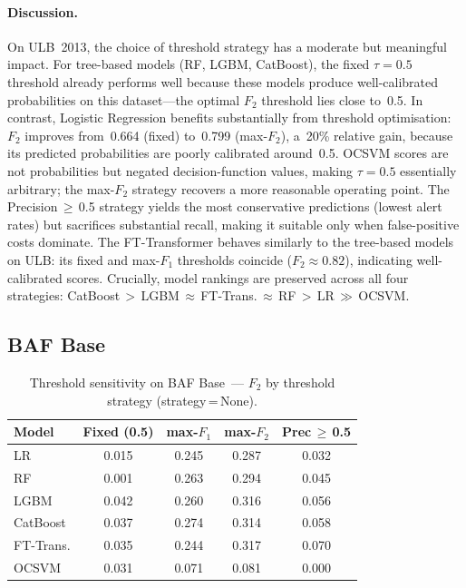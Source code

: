 \paragraph{Discussion.}
On ULB~2013, the choice of threshold strategy has a moderate but meaningful impact.
For tree-based models (RF, LGBM, CatBoost), the fixed $\tau=0.5$ threshold already performs well because these models produce well-calibrated probabilities on this dataset---the optimal $F_2$ threshold lies close to~0.5.
In contrast, Logistic Regression benefits substantially from threshold optimisation: $F_2$ improves from~0.664 (fixed) to~0.799 (max-$F_2$), a~20\% relative gain, because its predicted probabilities are poorly calibrated around~0.5.
OCSVM scores are not probabilities but negated decision-function values, making $\tau=0.5$ essentially arbitrary; the max-$F_2$ strategy recovers a more reasonable operating point.
The Precision\,$\geq$\,0.5 strategy yields the most conservative predictions (lowest alert rates) but sacrifices substantial recall, making it suitable only when false-positive costs dominate.
The FT-Transformer behaves similarly to the tree-based models on ULB: its fixed and max-$F_1$ thresholds coincide ($F_2\approx0.82$), indicating well-calibrated scores.
Crucially, model rankings are preserved across all four strategies: CatBoost\,$>$\,LGBM\,$\approx$\,FT-Trans.\,$\approx$\,RF\,$>$\,LR\,$\gg$\,OCSVM.


\subsection{BAF Base}

\begin{table}[ht!]
\centering
\caption{Threshold sensitivity on BAF Base~--- $F_2$ by threshold strategy (strategy\,=\,None).}
\label{tab:threshold_baf_f2}
\begin{tabular}{l c c c c}
\toprule
Model & Fixed (0.5) & max-$F_1$ & max-$F_2$ & Prec\,$\geq$\,0.5 \\
\midrule
LR         & 0.015 & 0.245 & 0.287 & 0.032 \\
RF         & 0.001 & 0.263 & 0.294 & 0.045 \\
LGBM       & 0.042 & 0.260 & 0.316 & 0.056 \\
CatBoost   & 0.037 & 0.274 & 0.314 & 0.058 \\
FT-Trans.  & 0.035 & 0.244 & 0.317 & 0.070 \\
OCSVM      & 0.031 & 0.071 & 0.081 & 0.000 \\
\bottomrule
\end{tabular}
\end{table}

